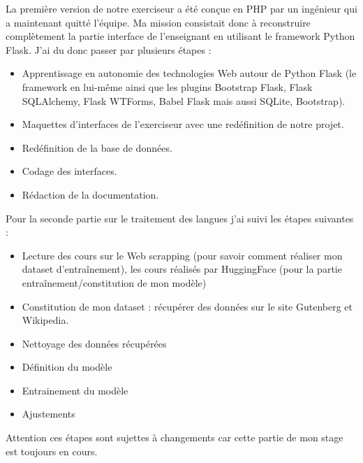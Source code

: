 \documentclass[12pt]{article}
\begin{document}
La première version de notre exerciseur a été conçue en PHP par un ingénieur qui a maintenant quitté l’équipe. Ma mission consistait donc à reconstruire complètement la partie interface de l’enseignant en utilisant le framework Python Flask. J’ai du donc passer par plusieurs étapes : 

\begin{itemize}


    \item Apprentissage en autonomie des technologies Web autour de Python Flask (le framework en lui-même ainsi que les plugins Bootstrap Flask, Flask SQLAlchemy, Flask WTForms, Babel Flask mais aussi SQLite, Bootstrap).
    
    \item Maquettes d'interfaces de l’exerciseur avec une redéfinition de notre projet.
    
    \item Redéfinition de la base de données. 
    
    \item Codage des interfaces.
    
    \item Rédaction de la documentation.
    
\end{itemize}

Pour la seconde partie sur le traitement des langues j'ai suivi les étapes suivantes :

\begin{itemize}
    \item Lecture des cours sur le Web scrapping (pour savoir comment réaliser mon dataset d'entraînement), les cours réalisés par HuggingFace (pour la partie entraînement/constitution de mon modèle)
    
    \item Constitution de mon dataset : récupérer des données sur le site Gutenberg et Wikipedia.
    
    \item Nettoyage des données récupérées
    
    \item Définition du modèle
    
    \item Entrainement du modèle
    
    \item Ajustements 
\end{itemize}

Attention ces étapes sont sujettes à changements car cette partie de mon stage est toujours en cours.
\end{document}
